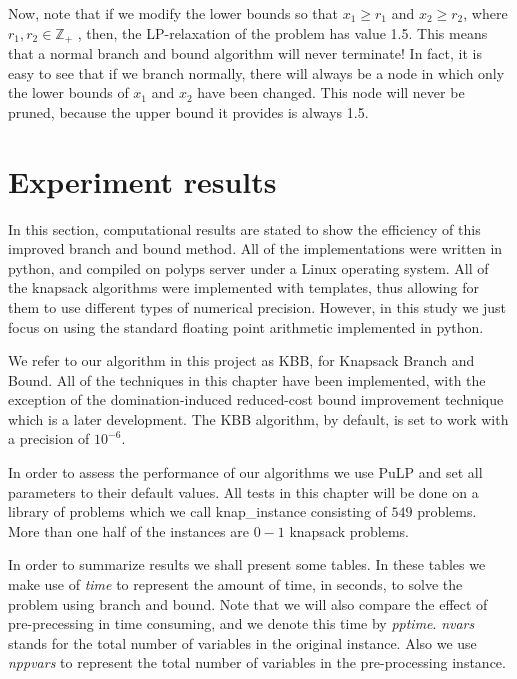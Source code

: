 \documentclass[a4paper,11pt]{article}
\begin{document}
Now, note that if we modify the lower bounds so that $x_1\geq r_1$ and $x_2 \geq r_2$, where $r_1 , r_2 \in \mathbb Z_+$ , then, the LP-relaxation of the problem has value 1.5. This means that a normal branch and bound algorithm will never terminate! In fact, it is easy to see that if we branch normally, there will always be a node in which only the lower bounds of $x_1$ and $x_2$ have been changed. This node will never be pruned, because the upper bound it provides is always 1.5.

\section{Experiment results}
In this section, computational results are stated to show the efficiency of this improved branch and bound method. All of the implementations were written in python, and compiled on polyps server under a Linux operating system. All of the knapsack algorithms were implemented with templates, thus allowing for them to use different types of numerical precision. However, in this study we just focus on using the standard floating point arithmetic implemented in python.

We refer to our algorithm in this project as KBB, for Knapsack Branch and Bound. All of the techniques in this chapter have been implemented, with the exception of the domination-induced reduced-cost bound improvement technique which is a later development. The KBB algorithm, by default, is set to work with a precision of $10^{-6}$.

In order to assess the performance of our algorithms we use PuLP and set all parameters to their default values. All tests in this chapter will be done on a library of problems which we call knap\_instance consisting of $549$ problems. More than one half of the instances are $0-1$ knapsack problems. 

In order to summarize results we shall present some tables. In these tables we make use of \textit{time} to represent the amount of time, in seconds, to solve the problem using branch and bound. Note that we will also compare the effect of pre-precessing in time consuming, and we denote this time by \textit{pptime}.  \textit{nvars} stands for the total number of variables in the original instance. Also we use \textit{nppvars} to represent the total number of variables in the pre-processing instance.

\end{document}
